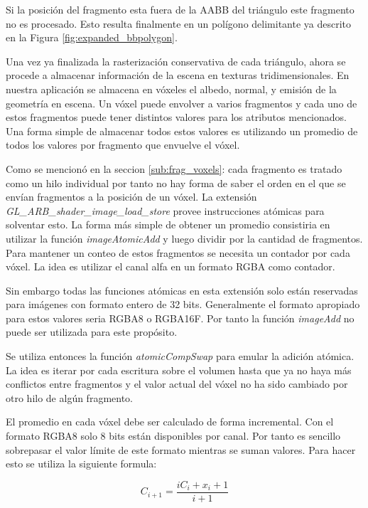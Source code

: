 Si la posición del fragmento esta fuera de la \ac{AABB} del triángulo este fragmento no es procesado. Esto resulta finalmente en un polígono delimitante ya descrito en la Figura \ref{fig:expanded_bbpolygon}.

Una vez ya finalizada la rasterización conservativa de cada triángulo, ahora se procede a almacenar información de la escena en texturas tridimensionales. En nuestra aplicación se almacena en vóxeles el albedo, normal, y emisión de la geometría en escena. Un vóxel puede envolver a varios fragmentos y cada uno de estos fragmentos puede tener distintos valores para los atributos mencionados. Una forma simple de almacenar todos estos valores es utilizando un promedio de todos los valores por fragmento que envuelve el vóxel. 

Como se mencionó en la seccion \ref{sub:frag_voxels}: cada fragmento es tratado como un hilo individual por tanto no hay forma de saber el orden en el que se envían fragmentos a la posición de un vóxel. La extensión \emph{GL\_ARB\_shader\_image\_load\_store} provee instrucciones atómicas para solventar esto. La forma más simple de obtener un promedio consistiria en utilizar la función \emph{imageAtomicAdd} y luego dividir por la cantidad de fragmentos. Para mantener un conteo de estos fragmentos se necesita un contador por cada vóxel. La idea es utilizar el canal alfa en un formato RGBA como contador. 

Sin embargo todas las funciones atómicas en esta extensión solo están reservadas para imágenes con formato entero de 32 bits. Generalmente el formato apropiado para estos valores seria RGBA8 o RGBA16F. Por tanto la función \emph{imageAdd} no puede ser utilizada para este propósito.

Se utiliza entonces la función \emph{atomicCompSwap} para emular la adición atómica. La idea es iterar por cada escritura sobre el volumen hasta que ya no haya más conflictos entre fragmentos y el valor actual del vóxel no ha sido cambiado por otro hilo de algún fragmento.

El promedio en cada vóxel debe ser calculado de forma incremental. Con el formato RGBA8 solo 8 bits están disponibles por canal. Por tanto es sencillo sobrepasar el valor límite de este formato mientras se suman valores. Para hacer esto se utiliza la siguiente formula:

\begin{equation}
	C_{i+1} = \frac{iC_{i}+x_i+1}{i+1}
\end{equation}

